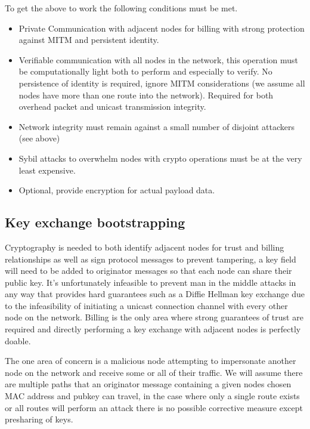 \documentclass[11pt]{article}
\begin{document}
                To get the above to work the following conditions must be met. 
                
                \begin{itemize}
                \item Private Communication with adjacent nodes for billing with strong protection against MITM and persistent identity. 
                \item Verifiable communication with all nodes in the network, this operation must be computationally light both to perform and especially to verify. No persistence of identity is required, ignore MITM considerations (we assume all nodes have more than one route into the network). Required for both overhead packet and unicast transmission integrity.
                \item Network integrity must remain against a small number of disjoint attackers (see above)
                \item Sybil attacks to overwhelm nodes with crypto operations must be at the very least expensive. 
                \item Optional, provide encryption for actual payload data. 
                \end{itemize}
               
    \subsection{Key exchange bootstrapping}
    
               Cryptography is needed to both identify adjacent nodes for trust and billing relationships as well as sign protocol messages to prevent tampering, a key field will need to be added to originator messages so that each node can share their public key. It's unfortunately infeasible to prevent man in the middle attacks in any way that provides hard guarantees such as a Diffie Hellman key exchange due to the infeasibility of initiating a unicast connection channel with every other node on the network. Billing is the only area where strong guarantees of trust are required and directly performing a key exchange with adjacent nodes is perfectly doable.
               
               The one area of concern is a malicious node attempting to impersonate another node on the network and receive some or all of their traffic. We will assume there are multiple paths that an originator message containing a given nodes chosen MAC address and pubkey can travel, in the case where only a single route exists or all routes will perform an attack there is no possible corrective measure except presharing of keys. 
               
\end{document}
